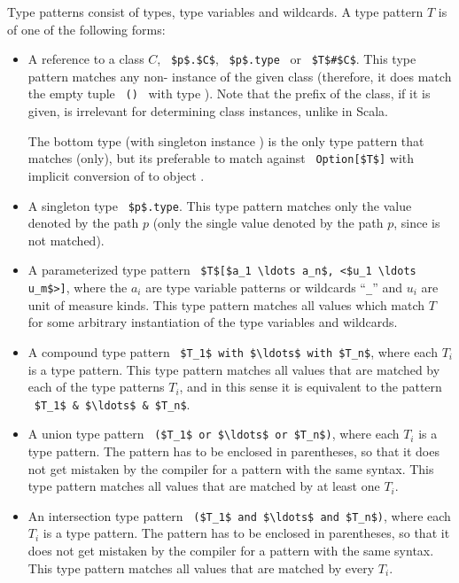 Type patterns consist of types, type variables and wildcards. A type pattern $T$ is of one of the following forms: 
\begin{itemize}
\item[]
A reference to a class $C$, ~\lstinline!$p$.$C$!, ~\lstinline!$p$.type!~ or ~\lstinline!$T$#$C$!. This type pattern matches any non- instance of the given class (therefore, it does match the empty tuple ~\lstinline!()!~ with type ). Note that the prefix of the class, if it is given, is irrelevant for determining class instances, unlike in Scala. 

The bottom type  (with singleton instance ) is the only type pattern that matches  (only), but its preferable to match against ~\lstinline!Option[$T$]! with implicit conversion of  to object . 

\item[]
A singleton type ~\lstinline!$p$.type!. This type pattern matches only the value denoted by the path $p$ (only the single value denoted by the path $p$, since  is not matched). 

\item[]
A parameterized type pattern ~\lstinline!$T$[$a_1 \ldots a_n$, <$u_1 \ldots u_m$>]!, where the $a_i$ are type variable patterns or wildcards ``\lstinline!_!'' and $u_i$ are unit of measure kinds. This type pattern matches all values which match $T$ for some arbitrary instantiation of the type variables and wildcards.  

\item[]
A compound type pattern ~\lstinline!$T_1$ with $\ldots$ with $T_n$!, where each $T_i$ is a type pattern. This type pattern matches all values that are matched by each of the type patterns $T_i$, and in this sense it is equivalent to the pattern ~\lstinline!$T_1$ & $\ldots$ & $T_n$!. 

\item[]
A union type pattern ~\lstinline!($T_1$ or $\ldots$ or $T_n$)!, where each $T_i$ is a type pattern. The pattern has to be enclosed in parentheses, so that it does not get mistaken by the compiler for a pattern with the same syntax. This type pattern matches all values that are matched by at least one $T_i$. 

\item[]
An intersection type pattern ~\lstinline!($T_1$ and $\ldots$ and $T_n$)!, where each $T_i$ is a type pattern. The pattern has to be enclosed in parentheses, so that it does not get mistaken by the compiler for a pattern with the same syntax. This type pattern matches all values that are matched by every $T_i$. 
\end{itemize}


